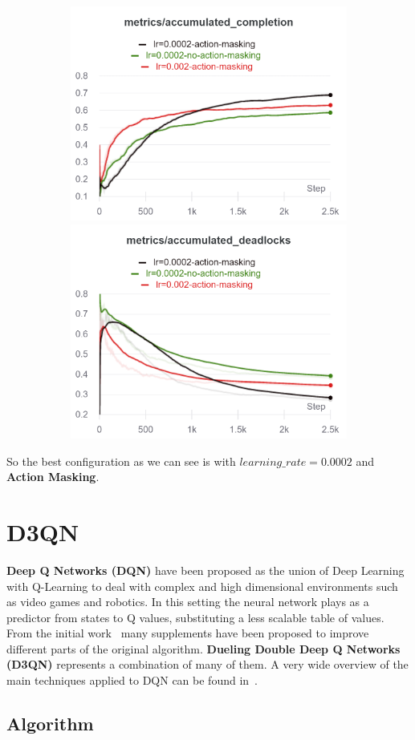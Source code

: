 \documentclass[11pt, a4paper, hidelinks]{report}
\begin{document}
\begin{figure}
\begin{subfigure}{\linewidth}
		\includegraphics[width=0.33\linewidth]{resources/charts_psppo_3/accumulated_completion}\hfill
		\includegraphics[width=0.33\linewidth]{resources/charts_psppo_3/accumulated_deadlocks}
	\end{subfigure}\par\medskip
	\caption{}
	\label{fig:psppo_training_lr_am}
\end{figure}

So the best configuration as we can see is with $learning\_rate = 0.0002$ and \textbf{Action Masking}.

\newpage
\section{D3QN}\label{sec:d3qn}

\textbf{Deep Q Networks (DQN)} have been proposed as the union of Deep Learning with Q-Learning to deal with complex and high dimensional environments such as video games and robotics.
In this setting the neural network plays as a predictor from states to Q values, substituting a less scalable table of values.
From the initial work~\citep{dqn} many supplements have been proposed to improve different parts of the original algorithm.
\textbf{Dueling Double Deep Q Networks (D3QN)} represents a combination of many of them.
A very wide overview of the main techniques applied to DQN can be found in~\citep{rainbow}.

\subsection{Algorithm}\label{subsec:algorithm2}
\end{document}

